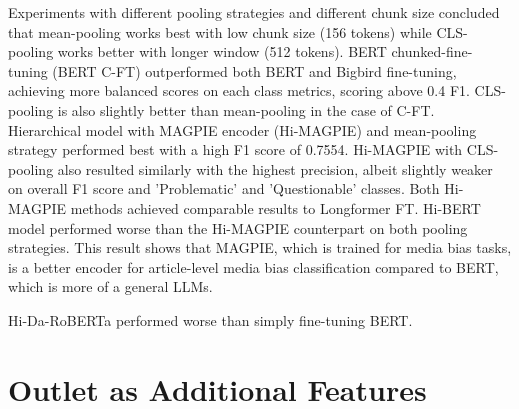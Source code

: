 Experiments with different pooling strategies and different chunk size concluded that mean-pooling works best with low chunk size (156 tokens) while CLS-pooling works better with longer window (512 tokens). BERT chunked-fine-tuning (BERT C-FT) outperformed both BERT and Bigbird fine-tuning, achieving more balanced scores on each class metrics, scoring above 0.4 F1. CLS-pooling is also slightly better than mean-pooling in the case of C-FT. Hierarchical model with MAGPIE encoder (Hi-MAGPIE) and mean-pooling strategy performed best with a high F1 score of 0.7554. Hi-MAGPIE with CLS-pooling also resulted similarly with the highest precision, albeit slightly weaker on overall F1 score and 'Problematic' and 'Questionable' classes. Both Hi-MAGPIE methods achieved comparable results to Longformer FT. Hi-BERT model performed worse than the Hi-MAGPIE counterpart on both pooling strategies. This result shows that MAGPIE, which is trained for media bias tasks, is a better encoder for article-level media bias classification compared to BERT, which is more of a general LLMs.

Hi-Da-RoBERTa performed worse than simply fine-tuning BERT.

\section{Outlet as Additional Features}

